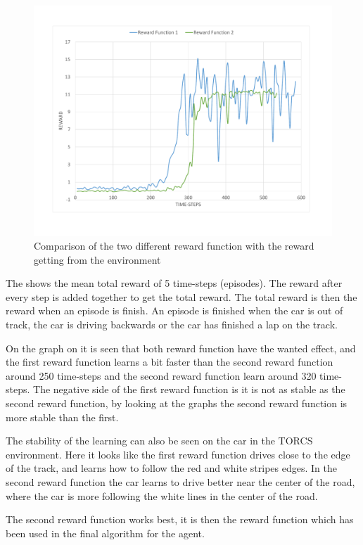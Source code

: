 \begin{figure}[H]
	\centering
	\includegraphics[width=1\textwidth]{Figures/Result/change_of_Reward_reward_graph.pdf}
	\caption{Comparison of the two different reward function with the reward getting from the environment}
	\label{fig:change_of_Reward_reward_graph}
\end{figure}

The  shows the mean total reward of 5 time-steps (episodes). The reward after every step is added together to get the total reward. The total reward is then the reward when an episode is finish. An episode is finished when the car is out of track, the car is driving backwards or the car has finished a lap on the track.  

On the graph on  it is seen that both reward function have the wanted effect, and the first reward function learns a bit faster than the second reward function around 250 time-steps and the second reward function learn around 320 time-steps. The negative side of the first reward function is it is not as stable as the second reward function, by looking at the graphs the second reward function is more stable than the first. 

The stability of the learning can also be seen on the car in the TORCS environment. Here it looks like the first reward function drives close to the edge of the track, and learns how to follow the red and white stripes edges. In the second reward function the car learns to drive better near the center of the road, where the car is more following the white lines in the center of the road. 

The second reward function works best, it is then the reward function which has been used in the final algorithm for the agent.  

